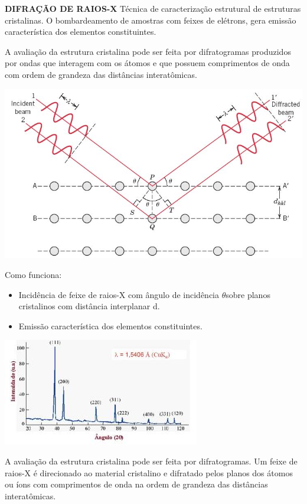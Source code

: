 \textbf{DIFRAÇÃO DE RAIOS-X} Técnica de caracterização estrutural de estruturas cristalinas. O bombardeamento de amostras com feixes de elétrons, gera emissão característica dos elementos constituintes.

A avaliação da estrutura cristalina pode ser feita por difratogramas produzidos por ondas que interagem com os átomos e que possuem comprimentos de onda com ordem de grandeza das distâncias interatômicas.

\includegraphics[scale=0.4,trim={0 0 0 0}]{figures/difracao}

Como funciona:

\begin{itemize}
	\item Incidência de feixe de raios-X com ângulo de incidência $\theta$sobre planos cristalinos com distância interplanar d.
	\item Emissão característica dos elementos constituintes.
\end{itemize}

\includegraphics[scale=0.4,trim={0 0 0 0}]{figures/difratograma}

A avaliação da estrutura cristalina pode ser feita por difratogramas. Um feixe de raios-X é direcionado ao material cristalino e difratado pelos planos dos átomos ou íons com comprimentos de onda na ordem de grandeza das distâncias interatômicas.

